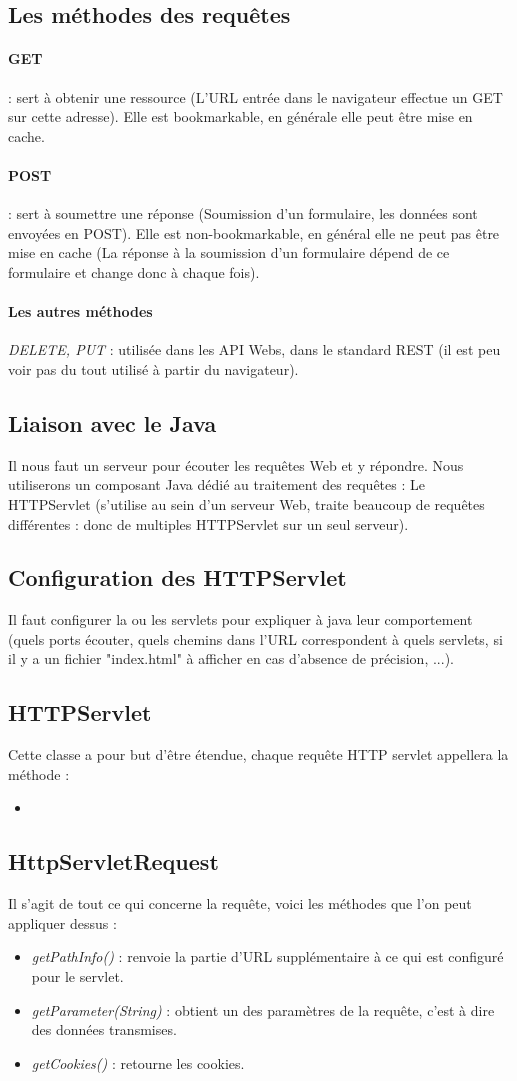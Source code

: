 \documentclass{article}[12pt]
\newcommand{\JavaScript}[2]{
	\begin{itemize}
		\item[]
	\end{itemize}
}
\begin{document}
\subsection{Les méthodes des requêtes}
\paragraph{GET} : sert à obtenir une ressource (L'URL entrée dans le navigateur effectue un GET sur cette adresse). Elle est bookmarkable, en générale elle peut être mise en cache.
\paragraph{POST} : sert à soumettre une réponse (Soumission d'un formulaire, les données sont envoyées en POST). Elle est non-bookmarkable, en général elle ne peut pas être mise en cache (La réponse à la soumission d'un formulaire dépend de ce formulaire et change donc à chaque fois).
\paragraph{Les autres méthodes}
\emph{DELETE, PUT} : utilisée dans les API Webs, dans le standard REST (il est peu voir pas du tout utilisé à partir du navigateur).
\subsection{Liaison avec le Java}
Il nous faut un serveur pour écouter les requêtes Web et y répondre. Nous utiliserons un composant Java dédié au traitement des requêtes : Le HTTPServlet (s'utilise au sein d'un serveur Web, traite beaucoup de requêtes différentes : donc de multiples HTTPServlet sur un seul serveur).
\subsection{Configuration des HTTPServlet}
Il faut configurer la ou les servlets pour expliquer à java leur comportement (quels ports écouter, quels chemins dans l'URL correspondent à quels servlets, si il y a un fichier "index.html" à afficher en cas d'absence de précision, ...).
\subsection{HTTPServlet}
Cette classe a pour but d'être étendue, chaque requête HTTP servlet appellera la méthode :
\JavaScript{methode_service}{Méthode Service}
\subsection{HttpServletRequest}
Il s'agit de tout ce qui concerne la requête, voici les méthodes que l'on peut appliquer dessus :
\begin{itemize}
	\item \emph{getPathInfo()} : renvoie la partie d'URL supplémentaire à ce qui est configuré pour le servlet.
    \item \emph{getParameter(String)} : obtient un des paramètres de la requête, c'est à dire des données transmises.
    \item \emph{getCookies()} : retourne les cookies.
\end{itemize}
\end{document}
